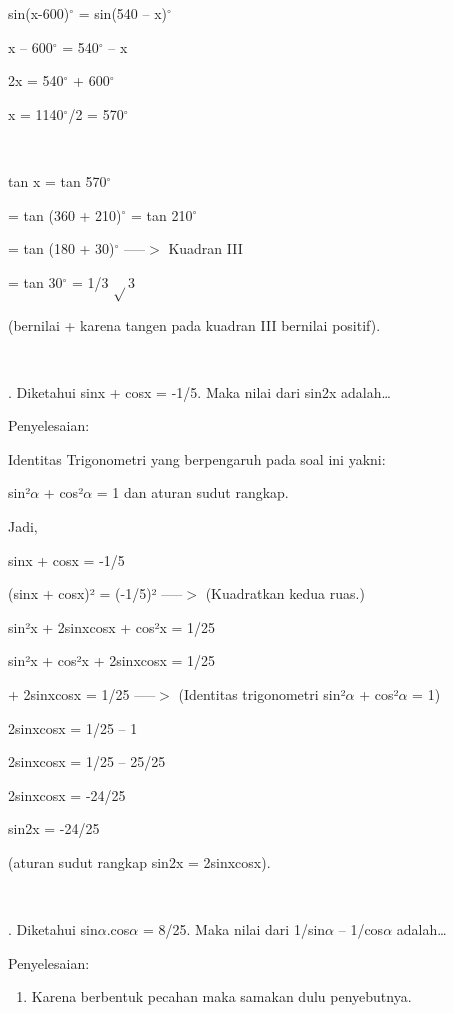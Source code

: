 \documentclass[11pt,fleqn]{book} %
\begin{document}
\begin{myEnumerate}
\begin{itemize}
\noindent sin(x-600)${}^\circ$ = sin(540 -- x)${}^\circ$

\noindent x -- 600${}^\circ$ = 540${}^\circ$ -- x

\noindent 2x = 540${}^\circ$ + 600${}^\circ$

\noindent x = 1140${}^\circ$/2 = 570${}^\circ$

\noindent ~

\noindent tan x = tan 570${}^\circ$

\noindent = tan (360 + 210)${}^\circ$ = tan 210${}^\circ$

\noindent = tan (180 + 30)${}^\circ$ -----$>$ Kuadran III

\noindent = tan 30${}^\circ$ = 1/3 $\mathrm{\sqrt{}}$3

\noindent (bernilai + karena tangen pada kuadran III bernilai positif).

\noindent ~

. Diketahui sinx + cosx = -1/5. Maka nilai dari sin2x adalah{\dots}

\noindent Penyelesaian:

\noindent Identitas Trigonometri yang berpengaruh pada soal ini yakni:

\noindent sin²$\alpha$ + cos²$\alpha$ = 1 dan aturan sudut rangkap.

\noindent Jadi,

\noindent sinx + cosx = -1/5

\noindent (sinx + cosx)² = (-1/5)² -----$>$ (Kuadratkan kedua ruas.)

\noindent sin²x + 2sinxcosx + cos²x = 1/25

\noindent sin²x + cos²x + 2sinxcosx = 1/25

 + 2sinxcosx = 1/25 -----$>$ (Identitas trigonometri sin²$\alpha$ + cos²$\alpha$ = 1)

\noindent 2sinxcosx = 1/25 -- 1

\noindent 2sinxcosx = 1/25 -- 25/25

\noindent 2sinxcosx = -24/25

\noindent sin2x = -24/25

\noindent (aturan sudut rangkap sin2x = 2sinxcosx).

\noindent ~

. Diketahui sin$\alpha$.cos$\alpha$ = 8/25. Maka nilai dari 1/sin$\alpha$ -- 1/cos$\alpha$ adalah{\dots}

\noindent Penyelesaian:

\begin{enumerate}
\item  Karena berbentuk pecahan maka samakan dulu penyebutnya.


\end{enumerate}
\end{itemize}
\end{myEnumerate}
\end{document}
